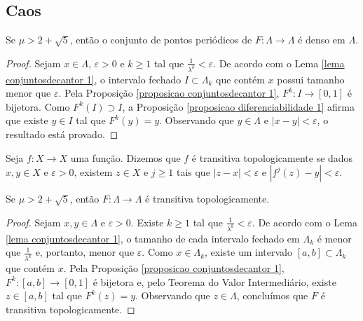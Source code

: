 \subsection{Caos}

\begin{proposition}
\label{proposicao caos 1}
Se $\mu > 2 + \sqrt{5}$, então o conjunto de pontos periódicos de $F: \Lambda \to \Lambda$ é denso em $\Lambda$.
\end{proposition}

\begin{proof}
Sejam $x \in \Lambda$, $\varepsilon > 0$ e $k \geq 1$ tal que $\frac{1}{\lambda^k} < \varepsilon$. De acordo com o Lema \ref{lema conjuntosdecantor 1}, o intervalo fechado $I \subset \Lambda_k$ que contém $x$ possui tamanho menor que $\varepsilon$. Pela Proposição \ref{proposicao conjuntosdecantor 1}, $F^k: I \to [0, 1]$ é bijetora. Como $F^k(I) \supset I$, a Proposição \ref{proposicao diferenciabilidade 1} afirma que existe $y \in I$ tal que $F^k(y) = y$. Observando que $y \in \Lambda$ e $|x - y| < \varepsilon$, o resultado está provado.
\end{proof}

\begin{definition}
Seja $f: X \to X$ uma função. Dizemos que $f$ é transitiva topologicamente se dados $x, y \in X$ e $\varepsilon > 0$,  existem $z \in X$ e $j \geq 1$ tais que $|z - x| < \varepsilon$ e $|f^j(z) - y| < \varepsilon$.
\end{definition} 

\begin{proposition}
\label{proposicao caos 2}
Se $\mu > 2 + \sqrt{5}$, então $F: \Lambda \to \Lambda$ é transitiva topologicamente.
\end{proposition}

\begin{proof}
Sejam $x, y \in \Lambda$ e $\varepsilon > 0$. Existe $k \geq 1$ tal que $\frac{1}{\lambda^k} < \varepsilon$. De acordo com o Lema \ref{lema conjuntosdecantor 1}, o tamanho de cada intervalo fechado em $\Lambda_k$ é menor que $\frac{1}{\lambda^k}$ e, portanto, menor que $\varepsilon$. Como $x \in \Lambda_ k$, existe um intervalo $[a, b] \subset \Lambda_ k$ que contém $x$. Pela Proposição \ref{proposicao conjuntosdecantor 1}, $F^k: [a, b] \to [0, 1]$ é bijetora e, pelo Teorema do Valor Intermediário, existe $z \in [a, b]$ tal que $F^k(z) = y$. Observando que $z \in \Lambda$, concluímos que $F$ é transitiva topologicamente.
\end{proof}


